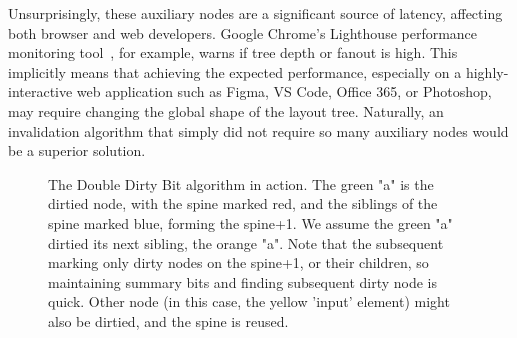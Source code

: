Unsurprisingly, these auxiliary nodes
  are a significant source of latency,
  affecting both browser and web developers.
Google Chrome's Lighthouse performance monitoring tool~\cite{lighthouse},
  for example, warns if tree depth or fanout is high.
This implicitly means that achieving the expected performance,
  especially on a highly-interactive web application
  such as Figma, VS Code, Office 365, or Photoshop,
  may require changing the global shape of the layout tree.
Naturally, an invalidation algorithm that simply
  did not require so many auxiliary nodes
  would be a superior solution.

\begin{figure}
\centering
\caption{The Double Dirty Bit algorithm in action. The green "a" is the dirtied node, with the spine marked red, and the siblings of the spine marked blue, forming the spine+1. We assume the green "a" dirtied its next sibling, the orange "a". Note that the subsequent marking only dirty nodes on the spine+1, or their children, so maintaining summary bits and finding subsequent dirty node is quick. Other node (in this case, the yellow 'input' element) might also be dirtied, and the spine is reused.}
\label{fig:dom-tree-db}
\end{figure}
